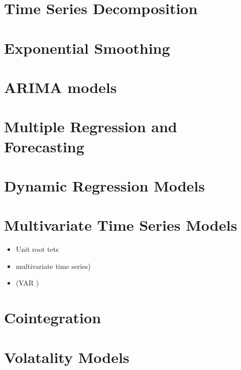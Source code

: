 \documentclass[]{book}
\providecommand{\tightlist}{%
  \setlength{\itemsep}{0pt}\setlength{\parskip}{0pt}}
\begin{document}
\hypertarget{time-series-decomposition}{%
\chapter{Time Series Decomposition}\label{time-series-decomposition}}

\hypertarget{exponential-smoothing}{%
\chapter{Exponential Smoothing}\label{exponential-smoothing}}

\hypertarget{arima-models}{%
\chapter{ARIMA models}\label{arima-models}}

\hypertarget{multiple-regression-and-forecasting}{%
\chapter{Multiple Regression and Forecasting}\label{multiple-regression-and-forecasting}}

\hypertarget{dynamic-regression-models}{%
\chapter{Dynamic Regression Models}\label{dynamic-regression-models}}

\hypertarget{multivariate-time-series-models}{%
\chapter{Multivariate Time Series Models}\label{multivariate-time-series-models}}

\begin{itemize}
\tightlist
\item
  Unit root tets
\item
  multivariate time series)
\item
  (VAR )
\end{itemize}

\hypertarget{cointegration}{%
\chapter{Cointegration}\label{cointegration}}

\hypertarget{volatality-models}{%
\chapter{Volatality Models}\label{volatality-models}}
\end{document}
